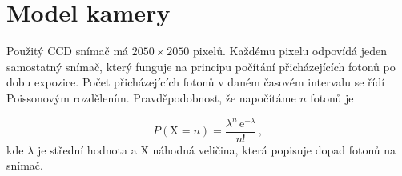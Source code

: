\section{Model kamery}
\label{sec:poisson}
 Použitý CCD snímač má $2050\times2050$ pixelů. Každému pixelu odpovídá jeden samostatný snímač, který funguje na principu počítání přicházejících fotonů po dobu expozice. Počet přicházejících fotonů v daném časovém intervalu se řídí Poissonovým rozdělením. Prav\-dě\-po\-dob\-nost, že napočítáme $n$ fotonů je 
 
 \begin{equation}
    P(\mathrm{X} = n)=\frac{\lambda ^{n}\,\mathrm{e}^{-\lambda}}{n!}\,,
 \end{equation}
 kde $\lambda$ je střední hodnota a $\mathrm{X}$ náhodná veličina, která popisuje dopad fotonů na snímač. 

\clearpage








